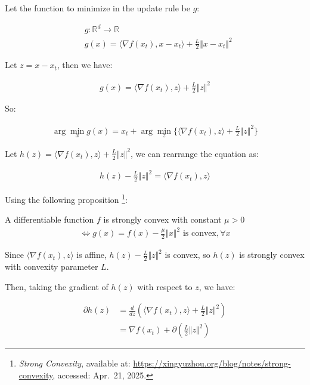 \documentclass{article}
\begin{document}
Let the function to minimize in the update rule be $g$: 

\begin{align*}
    &g: \mathbb{R}^d \to \mathbb{R} \\
    &g(x) = \langle \nabla f(x_t), x - x_t \rangle + \frac{L}{2} \Vert x - x_t \Vert^2 
\end{align*}

Let $z = x - x_t$, then we have:

\begin{align*}
    g(x) = \langle \nabla f(x_t), z \rangle + \frac{L}{2} \Vert z \Vert^2 
\end{align*}

So:

\begin{align*}
    \arg \min_x g(x) = x_t + \arg \min_z \{\langle \nabla f(x_t), z \rangle + \frac{L}{2} \Vert z \Vert^2 \}
\end{align*}

Let $h(z) = \langle \nabla f(x_t), z \rangle + \frac{L}{2} \Vert z \Vert^2$, we can rearrange the equation as:

\begin{align*}
    h(z) - \frac{L}{2} \Vert z \Vert^2 = \langle \nabla f(x_t), z \rangle
\end{align*}

Using the following proposition
\footnote{\textit{Strong Convexity}, available at: \url{https://xingyuzhou.org/blog/notes/strong-convexity}, accessed: Apr.~21, 2025.}:

\begin{tcolorbox}[greenbox, title = Proposition: Equivalent conditions of strong convexity]
    A differentiable function $f$ is strongly convex with constant $\mu > 0$
    \begin{align*}
        \Leftrightarrow g(x) = f(x) - \frac{\mu}{2} \Vert x \Vert^2 \text{ is convex}, \forall x
    \end{align*}
\end{tcolorbox}

Since $\langle \nabla f(x_t), z \rangle$ is affine, $h(z) - \frac{L}{2} \Vert z \Vert^2$ is convex,
so $h(z)$ is strongly convex with convexity parameter $L$.
\bigskip

Then, taking the gradient of $h(z)$ with respect to $z$, we have:

\begin{align*}
    \partial h(z)
    &= \frac{d}{dz} \left( \langle \nabla f(x_t), z \rangle + \frac{L}{2} \Vert z \Vert^2 \right) \\
    &= \nabla f(x_t) + \partial \left( \frac{L}{2} \Vert z \Vert^2 \right) 
\end{align*}
\end{document}

